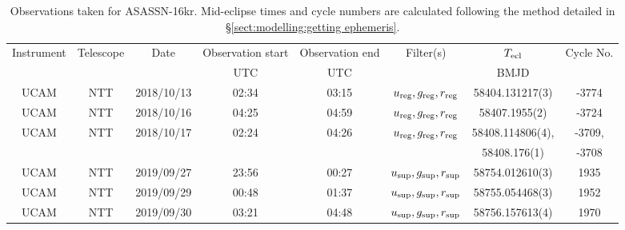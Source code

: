 \begin{table}
	\begin{center}
		\caption{Observations taken for ASASSN-16kr. Mid-eclipse times and cycle numbers are calculated following the method detailed in \S\ref{sect:modelling:getting ephemeris}.}
		\label{table:observing:observation logs ASASSN-16kr}
		\begin{tabular}{cccccccc}
			\hline
			Instrument & Telescope & Date & Observation start & Observation end & Filter(s) & $T_{\rm ecl}$ & Cycle No. \\
			 &  &  & UTC & UTC &  & BMJD &  \\
			\hline
			\hline
			UCAM & NTT & 2018/10/13 & 02:34 & 03:15 & $u_{\rm reg},g_{\rm reg},r_{\rm reg}$ & 58404.131217(3)  & -3774  \\
			UCAM & NTT & 2018/10/16 & 04:25 & 04:59 & $u_{\rm reg},g_{\rm reg},r_{\rm reg}$ & 58407.1955(2)    & -3724  \\
			UCAM & NTT & 2018/10/17 & 02:24 & 04:26 & $u_{\rm reg},g_{\rm reg},r_{\rm reg}$ & 58408.114806(4), & -3709, \\
			     &     &            &       &       &                                       &  58408.176(1)    & -3708  \\
			UCAM & NTT & 2019/09/27 & 23:56 & 00:27 & $u_{\rm sup},g_{\rm sup},r_{\rm sup}$ & 58754.012610(3)  & 1935   \\
			UCAM & NTT & 2019/09/29 & 00:48 & 01:37 & $u_{\rm sup},g_{\rm sup},r_{\rm sup}$ & 58755.054468(3)  & 1952   \\
			UCAM & NTT & 2019/09/30 & 03:21 & 04:48 & $u_{\rm sup},g_{\rm sup},r_{\rm sup}$ & 58756.157613(4)  & 1970   \\
		   \hline
		\end{tabular}
	\end{center}
\end{table}